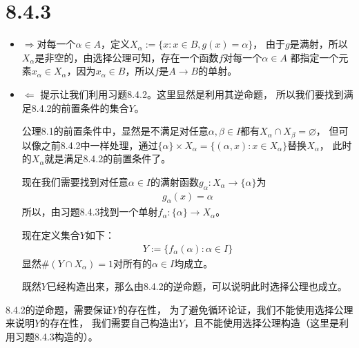 \documentclass{article}
\begin{document}
\section*{8.4.3}

\begin{itemize}
  \item $\Rightarrow$对每一个$\alpha \in A$，定义$X_\alpha := \{ x : x \in B, g(x) = \alpha\}$，
        由于$g$是满射，所以$X_\alpha$是非空的，由选择公理可知，存在一个函数$f$对每一个$\alpha \in A$
        都指定一个元素$x_\alpha \in X_\alpha$，因为$x_\alpha \in B$，所以$f$是$A \rightarrow B$的单射。

  \item $\Leftarrow$ 提示让我们利用习题8.4.2。这里显然是利用其逆命题，
        所以我们要找到满足8.4.2的前置条件的集合$Y$。

        公理8.1的前置条件中，显然是不满足对任意$\alpha, \beta \in I$都有$X_\alpha \cap X_\beta = \varnothing$，
        但可以像之前8.4.2中一样处理，通过$\{\alpha\} \times X_\alpha = \{(\alpha, x) : x \in X_\alpha \}$替换$X_\alpha$，
        此时的$X_\alpha$就是满足8.4.2的前置条件了。

        现在我们需要找到对任意$\alpha \in I$的满射函数$g_\alpha : X_\alpha \rightarrow \{\alpha\}$为
        \begin{align*}
          g_\alpha(x) = \alpha
        \end{align*}
        所以，由习题8.4.3找到一个单射$f_\alpha : \{\alpha\} \rightarrow X_\alpha$。

        现在定义集合$Y$如下：
        \begin{align*}
          Y := \{f_\alpha(\alpha) : \alpha \in I\}
        \end{align*}
        显然$\#(Y \cap X_\alpha) = 1$对所有的$\alpha \in I$均成立。

        既然$Y$已经构造出来，那么由8.4.2的逆命题，可以说明此时选择公理也成立。

\end{itemize}

\begin{zremark}
  8.4.2的逆命题，需要保证$Y$的存在性，
  为了避免循环论证，我们不能使用选择公理来说明$Y$的存在性，
  我们需要自己构造出$Y$，且不能使用选择公理构造（这里是利用习题8.4.3构造的）。
\end{zremark}
\end{document}
